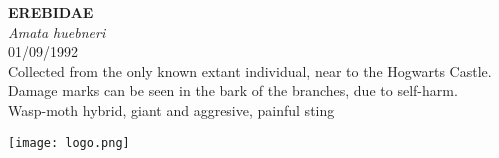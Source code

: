 \documentclass[
  landscape]{article}
\begin{document}
\begin{mdframed}[linecolor=mycolortext, linewidth=2pt, backgroundcolor=mycolor]

  \bigskip
  \begin{flushright}
  \begin{minipage}[t][-50ex][t]{16em}  
  \end{minipage}
  \end{flushright}
  \bigskip
  \begin{adjustwidth}{1cm}{1cm}
  {\fontsize{50pt}{0pt}\selectfont\bf\textcolor{mycolortext}{ EREBIDAE }} \\
  \linebreak
  \linebreak
  {\fontsize{40pt}{100pt}\selectfont\textcolor{mycolortext}{\emph{ Amata huebneri }}} \\
  \vfill
  {\fontsize{30pt}{100pt}\selectfont\textcolor{mycolortext}{ 01/09/1992 }} \\
  \vfill
  {\fontsize{30pt}{100pt}\selectfont\textcolor{mycolortext}{ Collected from the only known extant individual, near to the Hogwarts Castle. Damage marks can be seen in the bark of the branches, due to self-harm. }} \\
  \vfill
  {\fontsize{30pt}{50pt}\selectfont\textcolor{mycolortext}{ Wasp-moth hybrid, giant and aggresive, painful sting }} \\
  \end{adjustwidth}
  \begin{center}
  \texttt{[image: logo.png]}
  \end{center}
  \end{mdframed}
  \pagebreak

\end{document}
